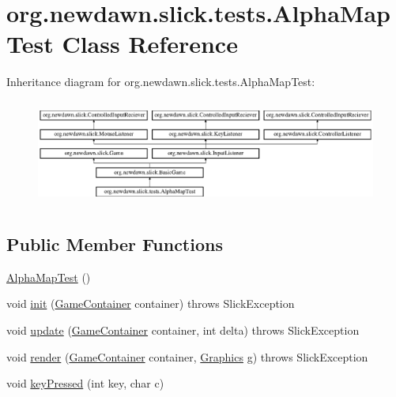 \hypertarget{classorg_1_1newdawn_1_1slick_1_1tests_1_1_alpha_map_test}{}\section{org.\+newdawn.\+slick.\+tests.\+Alpha\+Map\+Test Class Reference}
\label{classorg_1_1newdawn_1_1slick_1_1tests_1_1_alpha_map_test}
Inheritance diagram for org.\+newdawn.\+slick.\+tests.\+Alpha\+Map\+Test\+:\begin{figure}[H]
\begin{center}
\leavevmode
\includegraphics[height=3.522012cm]{classorg_1_1newdawn_1_1slick_1_1tests_1_1_alpha_map_test}
\end{center}
\end{figure}
\subsection*{Public Member Functions}
\begin{DoxyCompactItemize}
\item 
\mbox{\hyperlink{classorg_1_1newdawn_1_1slick_1_1tests_1_1_alpha_map_test_a2b9c7ee910b1bd0c590f169936e535e7}{Alpha\+Map\+Test}} ()
\item 
void \mbox{\hyperlink{classorg_1_1newdawn_1_1slick_1_1tests_1_1_alpha_map_test_a4daa13d1f96a2f22faa66cd033a44894}{init}} (\mbox{\hyperlink{classorg_1_1newdawn_1_1slick_1_1_game_container}{Game\+Container}} container)  throws Slick\+Exception 
\item 
void \mbox{\hyperlink{classorg_1_1newdawn_1_1slick_1_1tests_1_1_alpha_map_test_a42988459f515e69d91b96917c218b6e1}{update}} (\mbox{\hyperlink{classorg_1_1newdawn_1_1slick_1_1_game_container}{Game\+Container}} container, int delta)  throws Slick\+Exception 
\item 
void \mbox{\hyperlink{classorg_1_1newdawn_1_1slick_1_1tests_1_1_alpha_map_test_a11802d19ba7c484c9db38366c96c857e}{render}} (\mbox{\hyperlink{classorg_1_1newdawn_1_1slick_1_1_game_container}{Game\+Container}} container, \mbox{\hyperlink{classorg_1_1newdawn_1_1slick_1_1_graphics}{Graphics}} g)  throws Slick\+Exception 
\item 
void \mbox{\hyperlink{classorg_1_1newdawn_1_1slick_1_1tests_1_1_alpha_map_test_a2197f031e4bcff4d6fee89d27fdce412}{key\+Pressed}} (int key, char c)
\end{DoxyCompactItemize}
